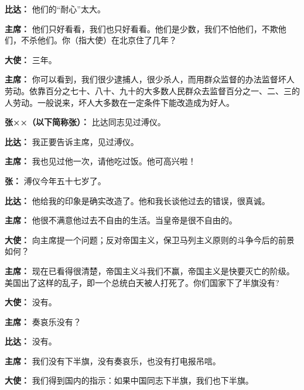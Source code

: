 \begin{duihua}
\item[\textbf{比达：}] 他们的“耐心”太大。

\item[\textbf{主席：}] 他们只好看看，我们也只好看看。他们是少数，我们不怕他们，不欺他们，不杀他们。你（指大使）在北京住了几年？

\item[\textbf{大使：}] 三年。

\item[\textbf{主席：}] 你可以看到，我们很少逮捕人，很少杀人，而用群众监督的办法监督坏人劳动。依靠百分之七十、八十、九十的大多数人民群众去监督百分之一、二、三的人劳动。一般说来，坏人大多数在一定条件下能改造成为好人。

\item[\textbf{张××（以下简称张）：}] 比达同志见过溥仪。

\item[\textbf{比达：}] 我正要告诉主席，见过溥仪。

\item[\textbf{主席：}] 我也见过他一次，请他吃过饭。他可高兴啦！

\item[\textbf{张：}] 溥仪今年五十七岁了。

\item[\textbf{比达：}] 他给我的印象是确实改造了。他和我长谈他过去的错误，很真诚。

\item[\textbf{主席：}] 他很不满意他过去不自由的生活。当皇帝是很不自由的。

\item[\textbf{大使：}] 向主席提一个问题；反对帝国主义，保卫马列主义原则的斗争今后的前景如何？

\item[\textbf{主席：}] 现在已看得很清楚，帝国主义斗我们不赢，帝国主义是快要灭亡的阶级。美国出了这样的乱子，即一个总统白天被人打死了。你们国家下了半旗没有?

\item[\textbf{大使：}] 没有。

\item[\textbf{主席：}] 奏哀乐没有？

\item[\textbf{比达：}] 没有。

\item[\textbf{主席：}] 我们没有下半旗，没有奏哀乐，也没有打电报吊唁。

\item[\textbf{大使：}] 我们得到国内的指示：如果中国同志下半旗，我们也下半旗。


\end{duihua}
